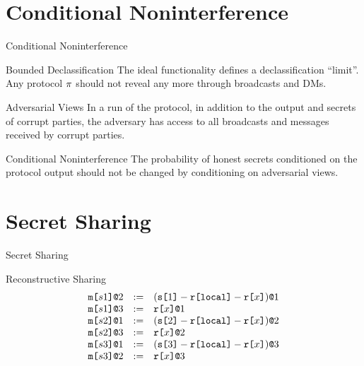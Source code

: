 \documentclass{beamer}
\begin{document}
\section{Conditional Noninterference}
\begin{frame}{Conditional Noninterference}
  
  \begin{block}{Bounded Declassification}
    The ideal functionality defines a declassification ``limit''. Any protocol $\pi$
    should not reveal any more through broadcasts and DMs.
  \end{block}

  \begin{block}{Adversarial Views}
    In a run of the protocol, in addition to the output and secrets of corrupt
    parties, the adversary has access to all broadcasts and messages received
    by corrupt parties.
  \end{block}

  \begin{alertblock}{Conditional Noninterference}
    The probability of honest secrets conditioned on the protocol output
    should not be changed by conditioning on adversarial views. 
  \end{alertblock}
  
\end{frame}

\section{Secret Sharing}
\begin{frame}{Secret Sharing}

  \begin{block}{Reconstructive Sharing}
    $$
    \begin{array}{lll}
      \texttt{m[}s1\texttt{]}\texttt{@}2 &:=& (\texttt{s[}1\texttt{]} - \texttt{r[}\mathtt{local}\texttt{]} - \texttt{r[}x\texttt{]})\texttt{@}1 \\ 
      \texttt{m[}s1\texttt{]}\texttt{@}3 &:=& \texttt{r[}x\texttt{]}\texttt{@}1 \\ 
      \texttt{m[}s2\texttt{]}\texttt{@}1 &:=& (\texttt{s[}2\texttt{]} - \texttt{r[}\mathtt{local}\texttt{]} - \texttt{r[}x\texttt{]})\texttt{@}2 \\ 
      \texttt{m[}s2\texttt{]}\texttt{@}3 &:=& \texttt{r[}x\texttt{]}\texttt{@}2 \\ 
      \texttt{m[}s3\texttt{]}\texttt{@}1 &:=& (\texttt{s[}3\texttt{]} - \texttt{r[}\mathtt{local}\texttt{]} - \texttt{r[}x\texttt{]})\texttt{@}3 \\ 
      \texttt{m[}s3\texttt{]}\texttt{@}2 &:=& \texttt{r[}x\texttt{]}\texttt{@}3
    \end{array}
    $$
  \end{block}
  
\end{frame}
\end{document}
